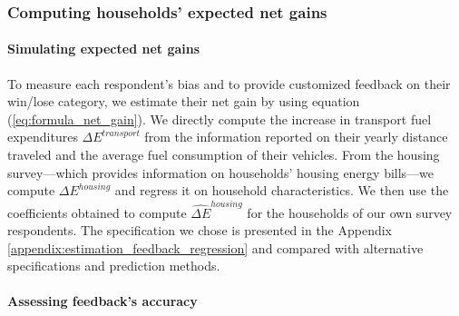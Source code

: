 \documentclass[12pt]{article} %
\begin{document}
\subsubsection{Computing households' expected net gains\label{subsubsec:computation_feedback}}


\paragraph{Simulating expected net gains}
To measure each respondent's bias and to provide customized feedback on their win/lose category, we estimate their net gain by using equation (\ref{eq:formula_net_gain}). We directly compute the increase in transport fuel expenditures $\Delta E^{transport}$ from the information reported on their yearly distance traveled and the average fuel consumption of their vehicles. From the housing survey---which provides information on households' housing energy bills---we compute $\Delta E^{housing}$ and regress it on household characteristics. We then use the coefficients obtained to compute $\widehat{\Delta E}^{housing}$ for the households of our own survey respondents. The specification we chose is presented in the Appendix \ref{appendix:estimation_feedback_regression} and compared with alternative specifications and prediction methods.


\paragraph{Assessing feedback's accuracy}
\end{document}
